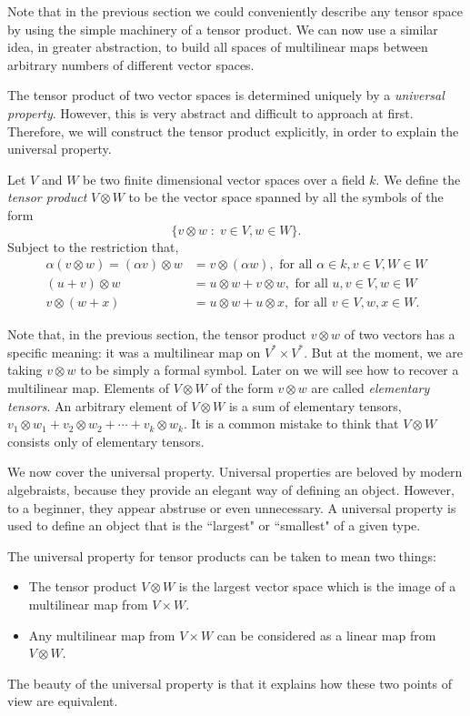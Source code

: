 \documentclass{owmaths}
\begin{document}
Note that in the previous section we could conveniently describe any tensor
space by using the simple machinery of a tensor product. We can now
use a similar idea, in greater abstraction, to build all spaces of multilinear maps
between arbitrary numbers of different vector spaces. 

The tensor product of two vector spaces is determined uniquely by a \emph{universal 
property}. However, this is very abstract and difficult to approach at
first. Therefore, we will construct the tensor product explicitly,
in order to explain the universal property.
\begin{definition}
    Let $V$ and $W$ be two finite dimensional vector spaces over a
    field $k$. We define the \emph{tensor product} $V \otimes W$
    to be the vector space spanned by all the symbols of the form
    \begin{equation*}
        \{ v\otimes w\;:\; v \in V, w \in W\}.
    \end{equation*}
    Subject to the restriction that,
    \begin{align*}
        \alpha(v\otimes w) = (\alpha v)\otimes w &= v\otimes (\alpha w), \text{ for all }\alpha \in k, v \in V, W\in W\\
        (u+v)\otimes w &= u\otimes w+v\otimes w, \text{ for all }u,v \in V, w \in W\\
        v \otimes (w+x) &= u\otimes w + u\otimes x, \text{ for all }v \in V, w,x \in W.
    \end{align*}
\end{definition}
Note that, in the previous section, the tensor product $v\otimes w$
of two vectors has a specific meaning: it was a multilinear map on $V^*\times V^*$.
But at the moment, we are taking $v\otimes w$ to be simply a formal symbol. Later
on we will see how to recover a multilinear map. Elements of $V\otimes W$
of the form $v\otimes w$ are called \emph{elementary tensors}. An arbitrary element
of $V\otimes W$ is a sum of elementary tensors, $v_1\otimes w_1+v_2\otimes w_2 + \cdots + v_k\otimes w_k$.
It is a common mistake to think that $V\otimes W$ consists only of elementary tensors.

We now cover the universal property. Universal properties are beloved
by modern algebraists, because they provide an elegant way of defining an object.
However, to a beginner, they appear abstruse or even unnecessary. A universal
property is used to define an object that is the ``largest" or ``smallest"
of a given type. 

The universal property for tensor products can be taken to mean two things:
\begin{itemize}
    \item{} The tensor product $V\otimes W$ is the largest vector space
    which is the image of a multilinear map from $V\times W$.
    \item{} Any multilinear map from $V\times W$ can be considered
    as a linear map from $V\otimes W$.
\end{itemize}
The beauty of the universal property is that it explains how these two points
of view are equivalent. 
\end{document}

